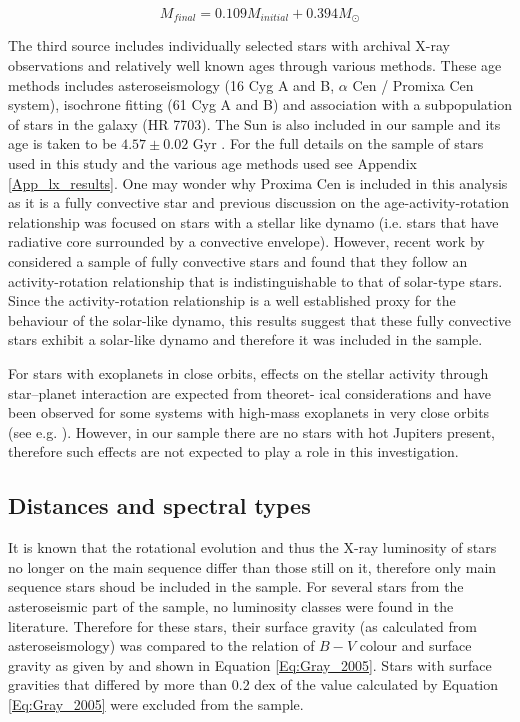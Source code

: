 \begin{equation}
    M_{final} = 0.109M_{initial} + 0.394M_{\odot}
    \label{Eq:WD_init_final_relationship}
\end{equation}

The third source includes individually selected stars with archival X-ray observations and relatively well known ages through various methods. These age methods includes asteroseismology (16 Cyg A and B, $\alpha$ Cen / Promixa Cen system), isochrone fitting (61 Cyg A and B) and association with a subpopulation of stars in the galaxy (HR 7703). The Sun is also included in our sample and its age is taken to be $4.57 \pm 0.02$ Gyr \citep{Bahcall_etal_1995}. For the full details on the sample of stars used in this study and the various age methods used see Appendix \ref{App_lx_results}. One may wonder why Proxima Cen is included in this analysis as it is a fully convective star and previous discussion on the age-activity-rotation relationship was focused on stars with a stellar like dynamo (i.e. stars that have radiative core surrounded by a convective envelope). However, recent work by \citet{Wright_Drake_2016} considered a sample of fully convective stars and found that they follow an activity-rotation relationship that is indistinguishable to that of solar-type stars. Since the activity-rotation relationship is a well established proxy for the behaviour of the solar-like dynamo, this results suggest that these fully convective stars exhibit a solar-like dynamo and therefore it was included in the sample.

For stars with exoplanets in close orbits, effects on the stellar activity through star–planet interaction are expected from theoret- ical considerations \citep{Cuntz_etal_2000} and have been observed for some systems with high-mass exoplanets in very close orbits (see e.g. \citealt{Poppenhaeger_Wolk_2014,Pillitteri_etal_2015}). However, in our sample there are no stars with hot Jupiters present, therefore such effects are not expected to play a role in this investigation.

\subsection{Distances and spectral types}
\label{Section_Xray_distances_and_spectype}
It is known that the rotational evolution and thus the X-ray luminosity of stars no longer on the main sequence differ than those still on it, therefore only main sequence stars shoud be included in the sample. For several stars from the asteroseismic part of the sample, no luminosity classes were found in the literature. Therefore for these stars, their surface gravity (as calculated from asteroseismology) was compared to the relation of $B-V$ colour and surface gravity as given by \citet{Gray_2005} and shown in Equation \ref{Eq:Gray_2005}. Stars with surface gravities that differed by more than 0.2 dex of the value calculated by Equation \ref{Eq:Gray_2005} were excluded from the sample.

